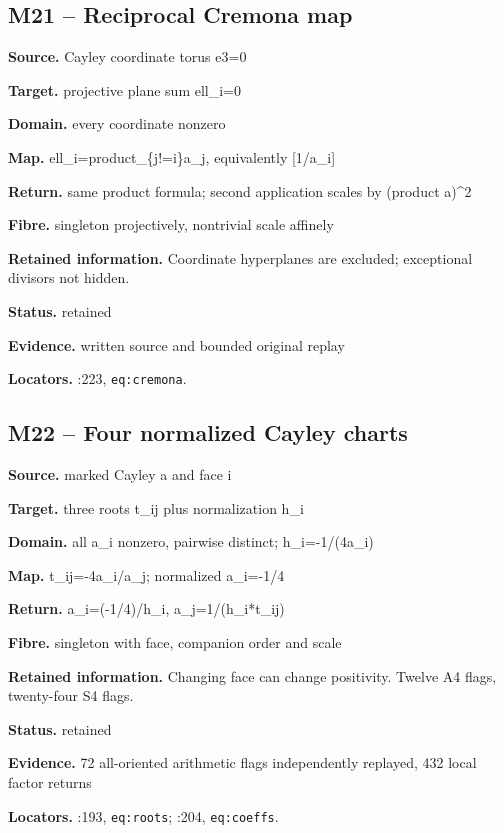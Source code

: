 \subsection*{M21 -- Reciprocal Cremona map}
\noindent\textbf{Source.} Cayley coordinate torus e3=0\par
\noindent\textbf{Target.} projective plane sum ell\_i=0\par
\noindent\textbf{Domain.} every coordinate nonzero\par
\noindent\textbf{Map.} ell\_i=product\_\{j!=i\}a\_j, equivalently [1/a\_i]\par
\noindent\textbf{Return.} same product formula; second application scales by (product a)\textasciicircum{}2\par
\noindent\textbf{Fibre.} singleton projectively, nontrivial scale affinely\par
\noindent\textbf{Retained information.} Coordinate hyperplanes are excluded; exceptional divisors not hidden.\par
\noindent\textbf{Status.} retained\par
\noindent\textbf{Evidence.} written source and bounded original replay\par
\noindent\textbf{Locators.} :223, \texttt{eq:cremona}.
\subsection*{M22 -- Four normalized Cayley charts}
\noindent\textbf{Source.} marked Cayley a and face i\par
\noindent\textbf{Target.} three roots t\_ij plus normalization h\_i\par
\noindent\textbf{Domain.} all a\_i nonzero, pairwise distinct; h\_i=-1/(4a\_i)\par
\noindent\textbf{Map.} t\_ij=-4a\_i/a\_j; normalized a\_i=-1/4\par
\noindent\textbf{Return.} a\_i=(-1/4)/h\_i, a\_j=1/(h\_i*t\_ij)\par
\noindent\textbf{Fibre.} singleton with face, companion order and scale\par
\noindent\textbf{Retained information.} Changing face can change positivity. Twelve A4 flags, twenty-four S4 flags.\par
\noindent\textbf{Status.} retained\par
\noindent\textbf{Evidence.} 72 all-oriented arithmetic flags independently replayed, 432 local factor returns\par
\noindent\textbf{Locators.} :193, \texttt{eq:roots}; :204, \texttt{eq:coeffs}.
